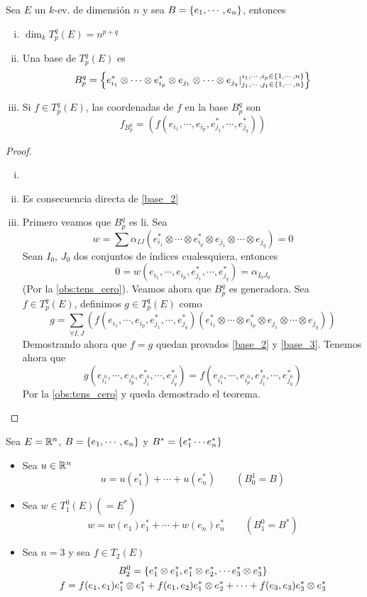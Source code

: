\begin{thm}[(base de $T_p^q(E)$)]
	Sea $E$ un $k$-ev. de dimensión $n$ y sea $B = \{e_1, \cdots, e_n\}$,
	entonces
\begin{enumerate}[i)]
		\item $\dim_k T_p^q(E) = n^{p+q}$
		\item \label{base_2} Una base de $T_p^q(E)$ es
		\[
			B_p^q = \left\{ e_{i_1}^* \otimes \cdots \otimes e_{i_p}^* \otimes
			e_{j_1} \otimes \cdots \otimes e_{j_q} \vert
			\substack{i_1, \cdots, i_p \in \{1,\cdots,n\} \\
				j_1, \cdots, j_1 \in \{1,\cdots,n\}} \right\}
		\]
		\item \label{base_3} Si $f \in T_p^q(E)$, las coordenadas de $f$ en la base $B_p^q$ son
		\[
			f_{B_p^q} = (f(e_{i_1}, \cdots, e_{i_p}, e_{j_1}^*, \cdots, e_{j_q}^*))
		\]
	\end{enumerate}
\end{thm}
\begin{proof}
	\begin{enumerate}[i)]
		\item[]
		\item Es consecuencia directa de \ref{base_2}
		\item Primero veamos que $B_p^q$ es li. Sea
		\[
			w = \sum \alpha_{IJ}(e_{i_1}^* \otimes \cdots \otimes e_{i_p}^*
			\otimes e_{j_1} \otimes \cdots \otimes e_{j_q}) = 0
		\]
		Sean $I_0$, $J_0$ dos conjuntos de índices cualesquiera, entonces
		\[
			0 = w(e_{i_1}, \cdots, e_{i_p}, e_{j_1}^*, \cdots, e_{j_q}^*)
			= \alpha_{I_0J_0}
		\]
		(Por la \cref{obs:tens_cero}). Veamos ahora que $B_p^q$
		es generadora. Sea $f \in T_p^q(E)$, definimos $g \in T_p^q(E)$ como
		\[
			g = \sum_{\forall I,J} (f(e_{i_1}, \cdots, e_{i_p}, e_{j_1}^*, \cdots,
			e_{j_q}^*)(e_{i_1}^* \otimes \cdots \otimes e_{i_p}^* \otimes e_{j_1}
			\otimes \cdots \otimes e_{j_q}))
		\]
		Demostrando ahora que $f=g$ quedan provados \ref{base_2} y \ref{base_3}.
		Tenemos ahora que
		\[
			g(e_{i_1^0}, \cdots, e_{i_p^0}, e_{j_1^0}^*, \cdots, e_{j_q^0}^*) =
			f(e_{i_1^0}, \cdots, e_{i_p^0}, e_{j_1^0}^*, \cdots, e_{j_q^0}^*)
		\]
		Por la \cref{obs:tens_cero} y queda demostrado el teorema.
	\end{enumerate}
\end{proof}
\begin{example}
	Sea $E = \mathbb{R}^n$, $B = \{e_1, \cdots, e_n\}$ y
	$B^* = \{e_1^* \cdots e_n^*\}$
	\begin{itemize}
		\item Sea $u \in \mathbb{R}^n$
		\[
			u = u(e_1^*) + \cdots + u(e_n^*) \qquad (B_0^1 = B)
		\]
		\item Sea $w \in T_1^0(E) (= E^*)$
		\[
			w = w(e_1)e_1^* + \cdots + w(e_n)e_n^* \qquad (B_1^0 = B^*)
		\]
		\item Sea $n = 3$ y sea $f \in T_2(E)$
		\begin{gather*}
			B_2^0 = \{e_1^* \otimes e_1^*, e_1^* \otimes e_2^*,
			\cdots e_3^* \otimes e_3^*\} \\ f = f(e_1,e_1)e_1^*\otimes e_1^* +
			f(e_1,e_2)e_1^*\otimes e_2^* +\cdots + f(e_3,e_3)e_3^* \otimes e_3^*
		\end{gather*}
	\end{itemize}
\end{example}
